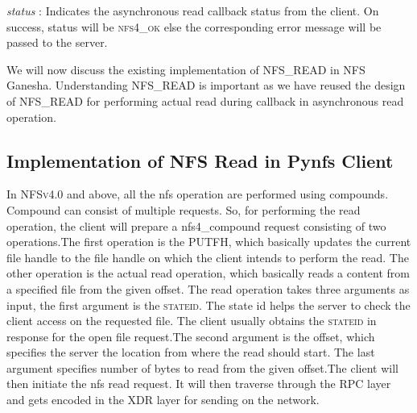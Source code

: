 \noindent\textit{status} : Indicates the asynchronous read callback status from the client. On success, status will be \textsc{nfs4\_ok} else the corresponding error message will be passed to the server.



We will now discuss the existing implementation of \textsc{NFS\_READ} in NFS Ganesha. Understanding \textsc{NFS\_READ} is important as we have reused the design of \textsc{NFS\_READ} for performing actual read during callback in asynchronous read operation.


\subsection{Implementation of NFS Read in Pynfs Client}
 
In \textsc{NFSv4.0} and above, all the nfs operation are performed using compounds. Compound can consist of multiple requests. So, for performing the read operation, the client will prepare a nfs4\_compound request consisting of two operations.The first operation is the \textsc{PUTFH}, which  basically updates the current file handle to the file handle on which the client intends to perform the read. The other operation is the actual read operation, which basically reads a content from a specified file from the given offset. The read operation takes three arguments as input, the first argument is the  \textsc{stateid}. The state id helps the server to check the client access on the requested file. The client usually obtains the \textsc{stateid} in response for the open file request.The second  argument is the offset, which specifies the server the location from where the read should start. The last argument specifies number of bytes to read from the given offset.The client will then initiate the nfs read request. It will then traverse through the RPC layer and gets encoded in the XDR layer for sending on the network.

